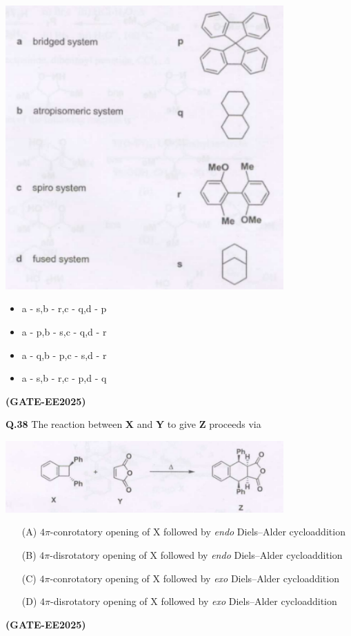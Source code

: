 \documentclass[12pt]{article}
\begin{document}
\begin{enumerate}
\begin{center}
    \includegraphics[width=0.8\textwidth]{figs/q37.png}
\end{center}
\begin{itemize}
    \item a - s,\quad b - r,\quad c - q,\quad d - p
    \item a - p,\quad b - s,\quad c - q,\quad d - r
    \item a - q,\quad b - p,\quad c - s,\quad d - r
    \item a - s,\quad b - r,\quad c - p,\quad d - q
\end{itemize}   \textbf{(GATE-EE2025)}


\textbf{Q.38} The reaction between \textbf{X} and \textbf{Y} to give \textbf{Z} proceeds via

\begin{center}
    \includegraphics[width=0.8\textwidth]{figs/q38.png}
\end{center}
\begin{enumerate}
    \item [(A)]$4\pi$-conrotatory opening of X followed by \textit{endo} Diels--Alder cycloaddition
    \item [(B)]$4\pi$-disrotatory opening of X followed by \textit{endo} Diels--Alder cycloaddition
    \item [(C)]$4\pi$-conrotatory opening of X followed by \textit{exo} Diels--Alder cycloaddition
    \item [(D)] $4\pi$-disrotatory opening of X followed by \textit{exo} Diels--Alder cycloaddition
\end{enumerate}   \textbf{(GATE-EE2025)}



\end{enumerate}
\end{document}
